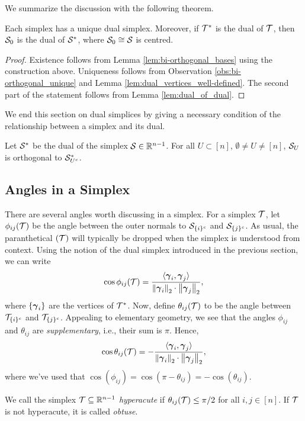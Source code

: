 We summarize the discussion with the following theorem. 

\begin{theorem}
	\label{thm:dual_simplex}
Each simplex has a unique dual simplex. Moreover, if $\mathcal{T}^*$ is the dual of $\mathcal{T}$, then $\mathcal{S}_0$ is the dual of $\mathcal{S}^*$, where $\mathcal{S}_0\cong \mathcal{S}$ is centred. 
  \end{theorem}
\begin{proof}
Existence follows from Lemma \ref{lem:bi-orthogonal_bases} using the construction above. Uniqueness follows from Observation \ref{obs:bi-orthogonal_unique} and Lemma \ref{lem:dual_vertices_well-defined}. The second part of the statement follows from Lemma \ref{lem:dual_of_dual}. 
\end{proof}

We end  this section  on dual simplices by giving a necessary condition of the relationship between a simplex and its dual. 

\begin{lemma}
	\label{lem:dual_faces_orthogonal}
	Let $\mathcal{S}^*$ be the dual of the simplex $\mathcal{S}\in\mathbb{R}^{n-1}$. For all $U\subset[n]$, $\emptyset\neq U\neq[n]$, $\mathcal{S}_U$ is orthogonal to $\mathcal{S}_{U^c}^*$.  
\end{lemma}

\subsection{Angles in a Simplex}
\label{sec:background_simplex_angles}
There are several angles worth discussing in a simplex. For a simplex $\mathcal{T}$, let $\phi_{ij}(\mathcal{T})$ be the angle between the outer normals to $\mathcal{S}_{\{i\}^c}$ and $\mathcal{S}_{\{j\}^c}$. As usual, the paranthetical $(\mathcal{T})$ will typically be dropped when the simplex is understood from context. Using the notion of the dual simplex introduced in the previous section, we can write 
 \begin{equation*}
\cos \phi_{ij}(\mathcal{T}) = \frac{\langle \vb*{\gamma}_i,\vb*{\gamma}_j\rangle }{\norm{\vb*{\gamma}_i}_2 \cdot \norm{\vb*{\gamma}_j}_2},
\end{equation*}
where $\{\vb*{\gamma}_i\}$ are the vertices of $\mathcal{T}^*$. 
Now, define $\theta_{ij}(\mathcal{T})$ to be the angle between $\mathcal{T}_{\{i\}^c}$ and $\mathcal{T}_{\{j\}^c}$. Appealing to elementary geometry, we see that the angles $\phi_{ij}$ and $\theta_{ij}$ are \emph{supplementary}, i.e., their sum is $\pi$. Hence, 
\begin{equation}
\label{eq:cos_theta_ij}
\cos \theta_{ij}(\mathcal{T}) = - \frac{\langle \vb*{\gamma}_i,\vb*{\gamma}_j\rangle }{\norm{\vb*{\gamma}_i}_2 \cdot \norm{\vb*{\gamma}_j}_2},
\end{equation}
where we've used that $\cos(\phi_{ij}) = \cos(\pi - \theta_{ij}) = -\cos(\theta_{ij})$. 

\begin{definition}
	\label{def:hyperacute}
	We call the simplex $\mathcal{T}\subseteq \mathbb{R}^{n-1}$ \emph{hyperacute} if $\theta_{ij}(\mathcal{T})\leq \pi/2$ for all $i,j\in[n]$. If $\mathcal{T}$ is not hyperacute, it is called \emph{obtuse}. 
\end{definition}


